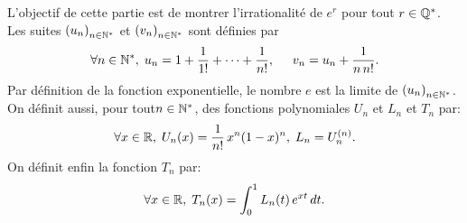 L'objectif de cette partie est de montrer l'irrationalité de $e^r$ pour tout $r\in \mathbb{Q}^*$.\newline
Les suites $\left( u_n \right)_{n \in \mathbb{N}^*}$ et $\left( v_n \right)_{n \in \mathbb{N}^*}$ sont définies par 
\[
 \forall n \in \mathbb{N}^*,\; u_n = 1 + \frac{1}{1!} + \cdots + \frac{1}{n!}, \hspace{0.5cm} v_n = u_n + \frac{1}{n\, n!}.
\]
Par définition de la fonction exponentielle, le nombre $e$ est la limite de $\left( u_n \right)_{n \in \mathbb{N}^*}$.\newline
On définit aussi, pour tout$n\in \mathbb{N}^*$, des fonctions polynomiales $U_n$ et $L_n$ et $T_n$ par:
 \[
  \forall x \in \mathbb{R}, \; U_n(x) = \frac{1}{n!}\,x^n(1-x)^n, \; L_n = U_n^{(n)}.
 \]
On définit enfin la fonction $T_n$ par:
\[
 \forall x \in \mathbb{R}, \; T_n(x) = \int_0^1 L_n(t)\, e^{xt}\, dt.
\]

